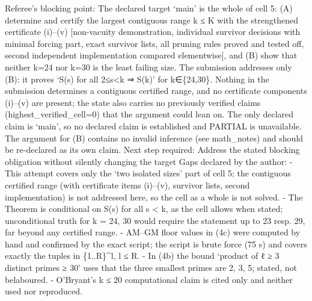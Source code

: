 Referee's blocking point: The declared target `main' is the whole of
cell 5: (A) determine and certify the largest contiguous range k ≤ K
with the strengthened certificate (i)--(v) {[}non-vacuity demonstration,
individual survivor decisions with minimal forcing part, exact survivor
lists, all pruning rules proved and tested off, second independent
implementation compared elementwise{]}, and (B) show that neither k=24
nor k=30 is the least failing size. The submission addresses only (B):
it proves `S(s) for all 2≤s\textless k ⇒ S(k)' for k∈\{24,30\}. Nothing
in the submission determines a contiguous certified range, and no
certificate components (i)--(v) are present; the state also carries no
previously verified claims (highest\_verified\_cell=0) that the argument
could lean on. The only declared claim is `main', so no declared claim
is established and PARTIAL is unavailable. The argument for (B) contains
no invalid inference (see math\_notes) and should be re-declared as its
own claim. Next step required: Address the stated blocking obligation
without silently changing the target Gaps declared by the author: - This
attempt covers only the `two isolated sizes' part of cell 5; the
contiguous certified range (with certificate items (i)--(v), survivor
lists, second implementation) is not addressed here, so the cell as a
whole is not solved. - The Theorem is conditional on S(s) for all s
\textless{} k, as the cell allows when stated; unconditional truth for k
= 24, 30 would require the statement up to 23 resp. 29, far beyond any
certified range. - AM--GM floor values in (4c) were computed by hand and
confirmed by the exact script; the script is brute force (75 s) and
covers exactly the tuples in \{1..\textbar R\textbar\}\^{}l, l ≤
\textbar R\textbar. - In (4b) the bound `product of ℓ ≥ 3 distinct
primes ≥ 30' uses that the three smallest primes are 2, 3, 5; stated,
not belaboured. - O'Bryant's k ≤ 20 computational claim is cited only
and neither used nor reproduced.

